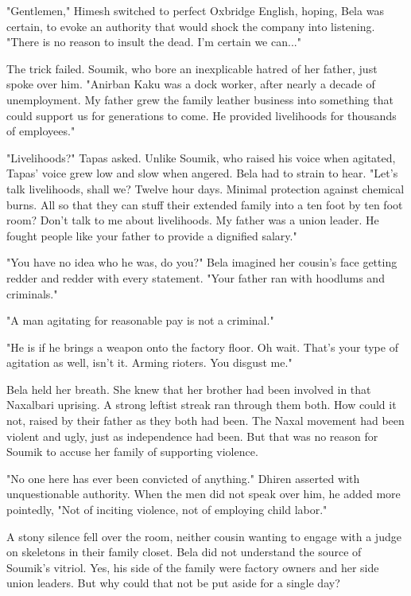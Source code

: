 \documentclass{amsart}
\begin{document}
"Gentlemen," Himesh switched to perfect Oxbridge English, hoping, Bela was certain, to evoke an authority that would shock the company into listening. "There is no reason to insult the dead. I'm certain we can..."

The trick failed. Soumik, who bore an inexplicable hatred of her father, just spoke over him. "Anirban Kaku was a dock worker, after nearly a decade of unemployment. My father grew the family leather business into something that could support us for generations to come. He provided livelihoods for thousands of employees."

"Livelihoods?" Tapas asked. Unlike Soumik, who raised his voice when agitated, Tapas' voice grew low and slow when angered. Bela had to strain to hear. "Let's talk livelihoods, shall we? Twelve hour days. Minimal protection against chemical burns. All so that they can stuff their extended family into a ten foot by ten foot room? Don't talk to me about livelihoods. My father was a union leader. He fought people like your father to provide a dignified salary."

"You have no idea who he was, do you?" Bela imagined her cousin's face getting redder and redder with every statement. "Your father ran with hoodlums and criminals." 

"A man agitating for reasonable pay is not a criminal." 

"He is if he brings a weapon onto the factory floor. Oh wait. That's your type of agitation as well, isn't it. Arming rioters. You disgust me."

Bela held her breath. She knew that her brother had been involved in that Naxalbari uprising. A strong leftist streak ran through them both. How could it not, raised by their father as they both had been. The Naxal movement had been violent and ugly, just as independence had been. But that was no reason for Soumik to accuse her family of supporting violence.

"No one here has ever been convicted of anything." Dhiren asserted with unquestionable authority. When the men did not speak over him, he added more pointedly, "Not of inciting violence, not of employing child labor." 

A stony silence fell over the room, neither cousin wanting to engage with a judge on skeletons in their family closet. Bela did not understand the source of Soumik's vitriol. Yes, his side of the family were factory owners and her side union leaders. But why could that not be put aside for a single day?
\end{document}
